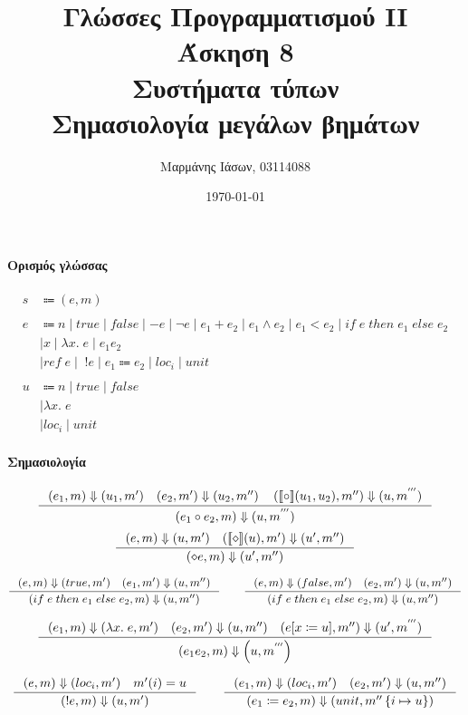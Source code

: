 \documentclass[a4paper,oneside, 12pt, fleqn]{article}
\title{
	\textbf{Γλώσσες Προγραμματισμού II}\\
	Άσκηση 8\\
	Συστήματα τύπων\\
	Σημασιολογία μεγάλων βημάτων
 }
\author{
	Μαρμάνης Ιάσων, 03114088
}
\date{\today}
\begin{document}
\maketitle



\paragraph*{Ορισμός γλώσσας}
\begin{align*}
	s &\Coloneqq (e, m)\\
	\\
	e &\Coloneqq n \mid true \mid false
	\mid -e \mid \neg e \mid e_1 + e_2 
	\mid e_1 \wedge e_2 \mid e_1 < e_2
	\mid if\; e\; then\; e_1\; else\; e_2\\
	&\mid x \mid \lambda x.\; e \mid e_1 e_2\\
	&\mid ref\; e \mid \; ! e \mid e_1 \Coloneqq e_2 \mid loc_i \mid unit\\
	\\
	u &\Coloneqq n \mid true \mid false\\
	&\mid \lambda x.\; e \\
	&\mid loc_i \mid unit
\end{align*}

\paragraph*{Σημασιολογία}
\[
\inference
{
	(e_1, m) \Downarrow (u_1, m') 
	\quad (e_2, m')  \Downarrow (u_2, m'')
	\quad \left([\![\circ]\!](u_1, u_2), m''\right)
		\Downarrow (u, m^{'''})
}
{
	(e_1 \circ e_2, m) \Downarrow 
	(u, m^{'''})
}
\]
\[
\inference
{
	(e, m) \Downarrow (u, m')
	\quad ([\![\diamond]\!](u), m') \Downarrow (u', m'')
}
{ 
	(\diamond e, m) \Downarrow (u', m'')
}
\]

\[
\inference
{(e, m) \Downarrow (true, m') \quad (e_1, m')
	 \Downarrow (u, m'')}
{(if\; e \; then\; e_1\; else\; e_2, m) \Downarrow (u, m'')}
\quad\quad
\inference
{(e, m) \Downarrow (false, m') \quad (e_2, m')
	\Downarrow (u, m'')}
{(if\; e \; then\; e_1\; else\; e_2, m) \Downarrow (u, m'')}
\]

\[
\inference
{(e_1, m) \Downarrow (\lambda x.\; e, m') 
	\quad (e_2, m') \Downarrow (u, m'')
	\quad (e[x \coloneqq u], m'') \Downarrow (u', m^{'''})
}
{(e_1 e_2, m) \Downarrow 
	\left(u, m^{'''}\right)}
\]

\[
\inference
{
	(e, m) \Downarrow (loc_i, m')
	\quad m'(i) = u
}
{(!e, m) \Downarrow (u,m')}
\qquad
\inference
{
	(e_1, m) \Downarrow (loc_i, m')
	\quad (e_2, m') \Downarrow (u, m'')
}
{
	(e_1 \coloneqq e_2, m) \Downarrow \left(unit, 
		m'' \left\{i \mapsto u \right\} \right)}
\]
\end{document}
